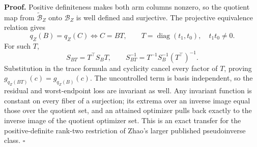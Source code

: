 \textbf{Proof.}
Positive definiteness makes both arm columns nonzero, so the quotient map from \(\widetilde{\mathcal B}_Z\) onto \(\mathcal B_Z\) is well defined and surjective.  The projective equivalence relation gives
\[
q_Z(B)=q_Z(C)\Longleftrightarrow C=BT,
\qquad T=\operatorname{diag}(t_1,t_0),\quad t_1t_0\ne0.
\tag{1}
\]
For such \(T\),
\[
S_{BT}=T^\top S_BT,
\qquad S_{BT}^{-1}=T^{-1}S_B^{-1}(T^\top)^{-1}.
\tag{2}
\]
Substitution in the trace formula and cyclicity cancel every factor of \(T\), proving \(g_{q_Z(BT)}(c)=g_{q_Z(B)}(c)\).  The uncontrolled term is basis independent, so the residual and worst-endpoint loss are invariant as well.  Any invariant function is constant on every fiber of a surjection; its extrema over an inverse image equal those over the quotient set, and an attained optimizer pulls back exactly to the inverse image of the quotient optimizer set.  This is an exact transfer for the positive-definite rank-two restriction of Zhao's larger published pseudoinverse class. \(\square\)